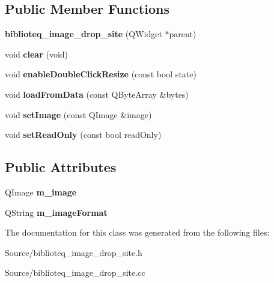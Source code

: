 \subsection*{Public Member Functions}
\begin{DoxyCompactItemize}
\item 
{\bfseries biblioteq\+\_\+image\+\_\+drop\+\_\+site} (Q\+Widget $\ast$parent)\hypertarget{classbiblioteq__image__drop__site_a530396fa05966eb322bd2a1125532ebf}{}\label{classbiblioteq__image__drop__site_a530396fa05966eb322bd2a1125532ebf}

\item 
void {\bfseries clear} (void)\hypertarget{classbiblioteq__image__drop__site_a3f88c28148dd3e47c928f90d19eb2602}{}\label{classbiblioteq__image__drop__site_a3f88c28148dd3e47c928f90d19eb2602}

\item 
void {\bfseries enable\+Double\+Click\+Resize} (const bool state)\hypertarget{classbiblioteq__image__drop__site_aa8ba78c79428c3347991a232d62b264a}{}\label{classbiblioteq__image__drop__site_aa8ba78c79428c3347991a232d62b264a}

\item 
void {\bfseries load\+From\+Data} (const Q\+Byte\+Array \&bytes)\hypertarget{classbiblioteq__image__drop__site_aaacb5dbb12a5e52402ebe21f9ca3dbb2}{}\label{classbiblioteq__image__drop__site_aaacb5dbb12a5e52402ebe21f9ca3dbb2}

\item 
void {\bfseries set\+Image} (const Q\+Image \&image)\hypertarget{classbiblioteq__image__drop__site_a40f01c405eb0b059d20cc46638c6f56c}{}\label{classbiblioteq__image__drop__site_a40f01c405eb0b059d20cc46638c6f56c}

\item 
void {\bfseries set\+Read\+Only} (const bool read\+Only)\hypertarget{classbiblioteq__image__drop__site_a4ea797056a2a0807e9acac0398b66422}{}\label{classbiblioteq__image__drop__site_a4ea797056a2a0807e9acac0398b66422}

\end{DoxyCompactItemize}
\subsection*{Public Attributes}
\begin{DoxyCompactItemize}
\item 
Q\+Image {\bfseries m\+\_\+image}\hypertarget{classbiblioteq__image__drop__site_a882e23b5ec4c5553a000c6a0811143bc}{}\label{classbiblioteq__image__drop__site_a882e23b5ec4c5553a000c6a0811143bc}

\item 
Q\+String {\bfseries m\+\_\+image\+Format}\hypertarget{classbiblioteq__image__drop__site_acebc24331f34bd5b4b7e4403e89f812b}{}\label{classbiblioteq__image__drop__site_acebc24331f34bd5b4b7e4403e89f812b}

\end{DoxyCompactItemize}


The documentation for this class was generated from the following files\+:\begin{DoxyCompactItemize}
\item 
Source/biblioteq\+\_\+image\+\_\+drop\+\_\+site.\+h\item 
Source/biblioteq\+\_\+image\+\_\+drop\+\_\+site.\+cc\end{DoxyCompactItemize}
